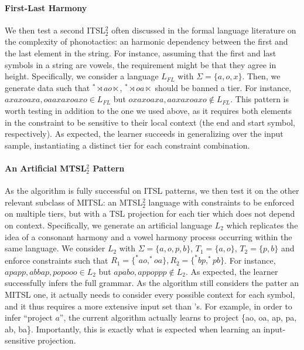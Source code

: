 \documentclass[11pt,a4paper]{article}
\begin{document}
\paragraph{First-Last Harmony}
We then test a second ITSL$^2_2$ often discussed in the formal language literature on the complexity of phonotactics: an harmonic dependency between the first and the last element in the string.
For instance, assuming that the first and last symbols in a string are vowels, the requirement might be that they agree in height.
Specifically, we consider a language $L_{FL}$ with $\Sigma =\{ a, o, x\}$.
Then, we generate data such that $^*\rtimes ao\ltimes$, $^*\rtimes oa\ltimes$ should be banned a tier.
For instance, $axaxoaxa, oaaxaxoaxo \in L_{FL}$ but  $oxaxoaxa, aaxaxoaxo \notin L_{FL}$.
This pattern is worth testing in addition to the one we used above, as it requires both elements in the constraint to be sensitive to their local context (the end and start symbol, respectively).
As expected, the learner succeeds in generalizing over the input sample, instantiating a distinct tier for each constraint combination.


\paragraph{An Artificial MTSL$^2_2$ Pattern} As the algorithm is fully successful on ITSL patterns, we then test it on the other relevant subclass of MITSL: an MTSL$^2_2$ language with constraints to be enforced on multiple tiers, but with a TSL projection for each tier which does not depend on context.
Specifically, we generate an artificial language $L_2$ which replicates the idea of a consonant harmony and a vowel harmony process occurring within the same language.
We consider  $L_2$ with $\Sigma = \{a, o, p, b\}$, $T_1=\{a,o\}$, $T_2=\{p,b\}$ and enforce constraints such that $R_1 = \{^*ao, ^*oa\}, R_2= \{^*bp, ^*pb\}$.
For instance, $apapp, abbap, popooo \in L_2$ but  $apabo, appoppp \notin L_2$.
As expected, the learner successfully infers the full grammar.
As the algorithm still considers the patter an MITSL one, it actually needs to consider every possible context for each symbol, and it thus requires a more extensive input set than \citet{McMullinSCIL2019}'s.
For example, in order to infer ``project $a$'', the current algorithm actually learns to project \{ao, oa, ap, pa, ab, ba\}.
Importantly, this is exactly what is expected when learning an input-sensitive projection.
\end{document}
